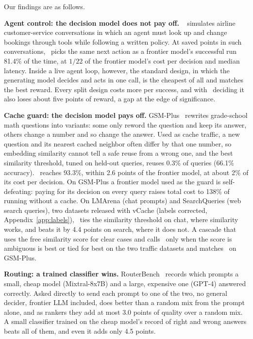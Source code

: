 Our findings are as follows.

\textbf{Agent control: the decision model does not pay off.}
\taubench~\cite{barres2025tau2} simulates airline customer-service conversations in which an agent must look up and change bookings through tools while following a written policy.
At saved points in such conversations, \jev\ picks the same next action as a frontier model's successful run 81.4\% of the time, at $1/22$ of the frontier model's cost per decision and median latency.
Inside a live agent loop, however, the standard design, in which the generating model decides and acts in one call, is the cheapest of all and matches the best reward.
Every split design costs more per success, and with \jev\ deciding it also loses about five points of reward, a gap at the edge of significance.

\textbf{Cache guard: the decision model pays off.}
GSM-Plus~\cite{li2024gsmplus} rewrites grade-school math questions into variants: some only reword the question and keep its answer, others change a number and so change the answer.
Used as cache traffic, a new question and its nearest cached neighbor often differ by that one number, so embedding similarity cannot tell a safe reuse from a wrong one, and the best similarity threshold, tuned on held-out queries, reuses 0.3\% of queries (66.1\% accuracy).
\jev\ reaches 93.3\%, within 2.6 points of the frontier model, at about 2\% of its cost per decision.
On GSM-Plus a frontier model used as the guard is self-defeating: paying for its decision on every query raises total cost to 138\% of running without a cache.
On LMArena (chat prompts) and SearchQueries (web search queries), two datasets released with vCache (labels corrected, Appendix~\ref*{app:labels}), \jev\ ties the similarity threshold on chat, where similarity works, and beats it by 4.4 points on search, where it does not.
A cascade that uses the free similarity score for clear cases and calls \jev\ only when the score is ambiguous is best or tied for best on the two traffic datasets and matches \jev\ on GSM-Plus.

\textbf{Routing: a trained classifier wins.}
RouterBench~\cite{hu2024routerbench} records which prompts a small, cheap model (Mixtral-8x7B) and a large, expensive one (GPT-4) answered correctly.
Asked directly to send each prompt to one of the two, no general decider, frontier LLM included, does better than a random mix from the prompt alone, and as rankers they add at most 3.0 points of quality over a random mix.
A small classifier trained on the cheap model's record of right and wrong answers beats all of them, and even it adds only 4.5 points.

